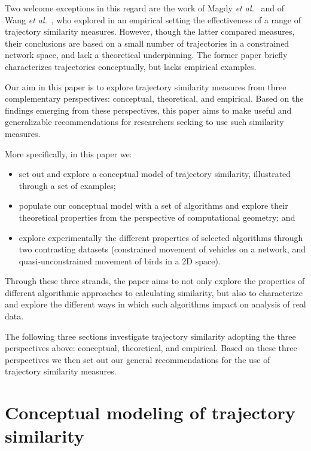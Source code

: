 \documentclass[10pt,letterpaper]{article}
\begin{document}
Two welcome exceptions in this regard are the work of Magdy \emph{et al.}~\cite{magdy2015review} and of Wang \emph{et al.}~\cite{wang2013effectiveness}, who explored in an empirical setting the effectiveness of a range of trajectory similarity measures. However, though the latter compared measures, their conclusions are based on a small number of trajectories in a constrained network space, and lack a theoretical underpinning. The former paper briefly characterizes trajectories conceptually, but lacks empirical examples. 

Our aim in this paper is to explore trajectory similarity measures from three complementary perspectives: conceptual, theoretical, and empirical. Based on the findings emerging from these perspectives, this paper aims  to make useful and generalizable recommendations for researchers seeking to use such similarity measures. 

More specifically, in this paper we: 

\begin{itemize}
\item set out and explore a conceptual model of trajectory similarity, illustrated through a set of examples;
\item populate our conceptual model with a set of algorithms and explore their theoretical properties from the perspective of computational geometry; and
\item explore experimentally the different properties of selected algorithms through two contrasting datasets (constrained movement of vehicles on a network, and quasi-unconstrained movement of birds in a 2D space). 
\end{itemize}

Through these three strands, the paper aims to not only explore the properties of different algorithmic approaches to calculating similarity, but also to characterize and explore the different ways in which such algorithms impact on analysis of real data. 

The following three sections investigate trajectory similarity adopting the three perspectives above: conceptual, theoretical, and empirical. Based on these three perspectives we then set out our general recommendations for the use of trajectory similarity measures.


\section{Conceptual modeling of trajectory similarity}
	\label{sub:conceptual}
\end{document}
